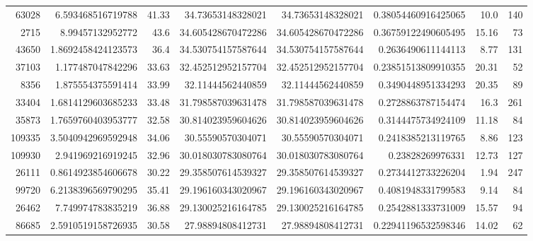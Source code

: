 \documentclass[14pt]{article} %
\begin{document}
\begin{landscape}
\begin{spacing}{1.0}
\begin{table}[h]
\begin{tabular}{|r|r|r|r|r|r|r|r|}
63028&6.593468516719788&41.33&34.73653148328021&34.73653148328021&0.38054460916425065&10.0&140\\
2715&8.99457132952772&43.6&34.605428670472286&34.605428670472286&0.36759122490605495&15.16&73\\
43650&1.8692458424123573&36.4&34.530754157587644&34.530754157587644&0.2636490611144113&8.77&131\\
37103&1.177487047842296&33.63&32.452512952157704&32.452512952157704&0.23851513809910355&20.31&52\\
8356&1.875554375591414&33.99&32.11444562440859&32.11444562440859&0.3490448951334293&20.35&89\\
33404&1.6814129603685233&33.48&31.798587039631478&31.798587039631478&0.2728863787154474&16.3&261\\
35873&1.7659760403953777&32.58&30.814023959604626&30.814023959604626&0.3144475734924109&11.18&84\\
109335&3.5040942969592948&34.06&30.55590570304071&30.55590570304071&0.2418385213119765&8.86&123\\
109930&2.941969216919245&32.96&30.018030783080764&30.018030783080764&0.23828269976331&12.73&127\\
26111&0.8614923854606678&30.22&29.358507614539327&29.358507614539327&0.2734412733226204&1.94&247\\
99720&6.2138396569790295&35.41&29.196160343020967&29.196160343020967&0.4081948331799583&9.14&84\\
26462&7.749974783835219&36.88&29.130025216164785&29.130025216164785&0.2542881333731009&15.57&94\\
86685&2.5910519158726935&30.58&27.98894808412731&27.98894808412731&0.22941196532598346&14.02&62\\
\hline 
\end{tabular}
\end{table}

\newpage


\end{spacing}
\end{landscape}
\end{document}
